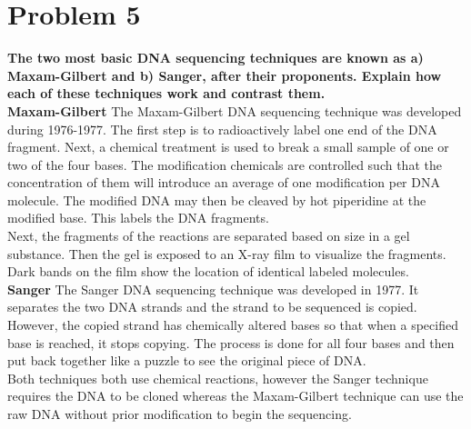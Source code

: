 \section{ Problem 5 }
\textbf{ The two most basic DNA sequencing techniques are known as a) Maxam-Gilbert and b) Sanger, after their proponents. Explain how each of these techniques work and contrast them. }\\
\newline
\textbf{Maxam-Gilbert}
The Maxam-Gilbert DNA sequencing technique was developed during 1976-1977. The first step is to radioactively label one end of the DNA fragment. Next, a chemical treatment is used to break a small sample of one or two of the four bases. The modification chemicals are controlled such that the concentration of them will introduce an average of one modification per DNA molecule. The modified DNA may then be cleaved by hot piperidine at the modified base. This labels the DNA fragments.\\
Next, the fragments of the reactions are separated based on size in a gel substance. Then the gel is exposed to an X-ray film to visualize the fragments. Dark bands on the film show the location of identical labeled molecules. \\
\newline
\textbf{Sanger}
The Sanger DNA sequencing technique was developed in 1977. It separates the two DNA strands and the strand to be sequenced is copied. However, the copied strand has chemically altered bases so that when a specified base is reached, it stops copying. The process is done for all four bases and then put back together like a puzzle to see the original piece of DNA.\\
\newline
Both techniques both use chemical reactions, however the Sanger technique requires the DNA to be cloned whereas the Maxam-Gilbert technique can use the raw DNA without prior modification to begin the sequencing. 